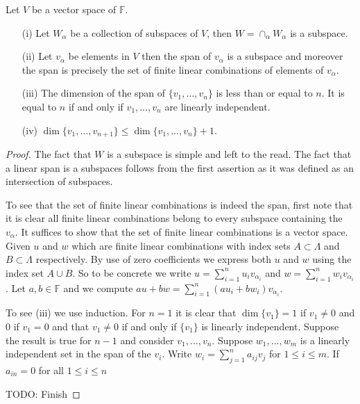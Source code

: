 \begin{prop}Let $V$ be a vector space of $\mathds{F}$. 
\begin{itemize}
\item[(i)]Let $W_\alpha$ be a collection of subspaces of $V$, then $W = \cap_\alpha W_\alpha$ is a subspace.  
\item[(ii)] Let $v_\alpha$ be elements in $V$ then the span of $v_\alpha$ is a subspace and moreover the span is precisely the set of finite linear combinations of elements of $v_\alpha$.  
\item[(iii)]The dimension of the span of $\lbrace v_1, \dotsc, v_n \rbrace$ is less than or equal to $n$.  It is equal to $n$ if and only if $v_1, \dotsc, v_n$ are linearly independent.
\item[(iv)]$\dim \lbrace v_1, \dotsc, v_{n+1} \rbrace \leq \dim \lbrace v_1, \dotsc, v_n \rbrace + 1$.
\end{itemize}
\end{prop}
\begin{proof}
The fact that $W$ is a subspace is simple and left to the read.  The fact that a linear span is a subspaces follows from the first assertion as it was defined as an intersection of subspaces.  

To see that the set of finite linear combinations is indeed the span, first note that it is clear all finite linear combinations belong to every subspace containing the $v_\alpha$.  It suffices to show that the set of finite linear combinations is a vector space.  Given $u$ and $w$ which are finite linear combinations with index sets $A \subset \Lambda$ and $B \subset \Lambda$ respectively.  By use of zero coefficients we express both $u$ and $w$ using the index set $A \cup B$.  So to be concrete we write $u = \sum_{i=1}^n u_i v_{\alpha_i}$ and $w = \sum_{i=1}^n w_i v_{\alpha_i}$.  Let $a,b \in \mathds{F}$ and we compute $au + bw = \sum_{i=1}^n (au_i + bw_i) v_{\alpha_i}$.

To see (iii) we use induction.  For $n=1$ it is clear that $\dim\lbrace v_1 \rbrace = 1$ if $v_1 \neq 0$ and $0$ if $v_1 = 0$ and that $v_1 \neq 0$ if and only if $\lbrace v_1 \rbrace$ is linearly independent.  Suppose the result is true for $n-1$ and consider $v_1, \dots, v_n$.  Suppose $w_1, \dotsc, w_m$ is a linearly independent set in the span of the $v_i$.  Write
$w_i = \sum_{j=1}^n a_{ij} v_j$ for $1 \leq i \leq m$.  If $a_{in}=0$ for all $1 \leq i \leq n$

TODO: Finish
\end{proof}


